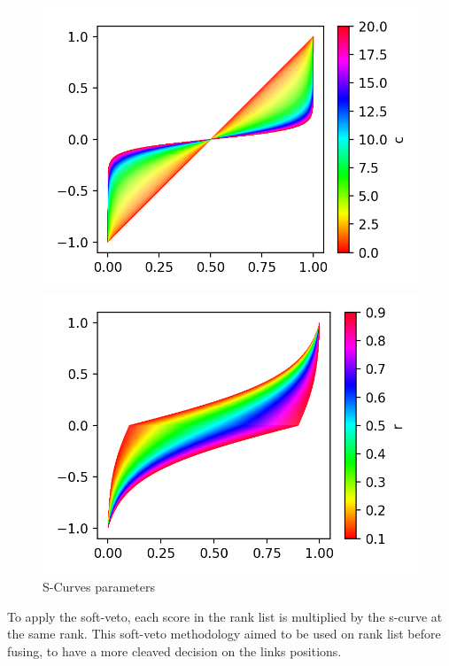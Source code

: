 \begin{figure}
  \centering
  \caption{S-Curves parameters}
  \label{fig:s_curve_params}

  \label{fig:s_curve_c}
  \includegraphics[width=\linewidth]{img/s_curve_c.png}

  \label{fig:s_curve_r}
  \includegraphics[width=\linewidth]{img/s_curve_r.png}
\end{figure}

To apply the soft-veto, each score in the rank list is multiplied by the s-curve at the same rank.
This soft-veto methodology aimed to be used on rank list before fusing, to have a more cleaved decision on the links positions.

